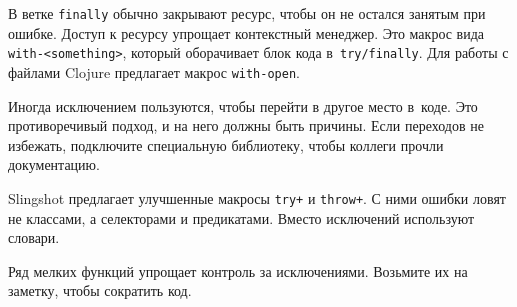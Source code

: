 В ветке \verb|finally| обычно закрывают ресурс, чтобы он не остался
занятым при ошибке. Доступ к ресурсу упрощает контекстный менеджер. Это макрос
вида \verb|with-<something>|, который оборачивает блок кода
в~\verb|try/finally|. Для работы с файлами Clojure предлагает макрос
\verb|with-open|.

Иногда исключением пользуются, чтобы перейти в другое место в~коде. Это
противоречивый подход, и на него должны быть причины. Если переходов не
избежать, подключите специальную библиотеку, чтобы коллеги прочли документацию.

Slingshot предлагает улучшенные макросы \verb|try+| и \verb|throw+|. С ними
ошибки ловят не классами, а селекторами и предикатами. Вместо исключений
используют словари.

Ряд мелких функций упрощает контроль за исключениями. Возьмите их на заметку,
чтобы сократить код.
